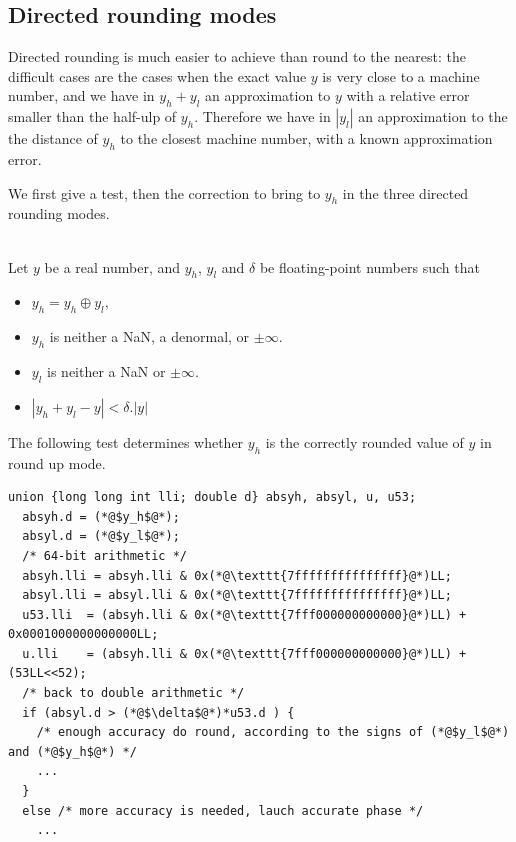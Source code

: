 \subsection{Directed rounding modes}

Directed rounding is much easier to achieve than round to the nearest:
the difficult cases are the cases when the exact value $y$ is very
close to a machine number, and we have in $y_h+y_l$ an approximation to
$y$ with a relative error smaller than the half-ulp of $y_h$.
Therefore we have in $|y_l|$ an approximation to the the distance of
$y_h$ to the closest machine number, with a known approximation error.

We first give a test, then the correction to bring to $y_h$ in the
three directed rounding modes.
\begin{theorem}
\label{th:roundingDirected}
~\\
Let $y$ be a real number, and $y_h$, $y_l$ and $\delta$ be
floating-point numbers such that
  \begin{itemize}
  \item $y_h=y_h\oplus y_l$,
  \item $y_h$ is neither a NaN, a denormal, or $\pm \infty$.
  \item $y_l$ is neither a NaN or $\pm \infty$.
  \item $|y_h+y_l - y| < \delta.|y|$
\end{itemize}

The following test determines whether $y_h$ is the
  correctly rounded value of $y$ in round up mode.

\begin{lstlisting}[caption={Test for directed rounding},
  firstnumber=1]
  union {long long int lli; double d} absyh, absyl, u, u53;
  absyh.d = (*@$y_h$@*);
  absyl.d = (*@$y_l$@*);
  /* 64-bit arithmetic */
  absyh.lli = absyh.lli & 0x(*@\texttt{7fffffffffffffff}@*)LL;
  absyl.lli = absyl.lli & 0x(*@\texttt{7fffffffffffffff}@*)LL;
  u53.lli  = (absyh.lli & 0x(*@\texttt{7fff000000000000}@*)LL) + 0x0001000000000000LL;
  u.lli    = (absyh.lli & 0x(*@\texttt{7fff000000000000}@*)LL) + (53LL<<52);
  /* back to double arithmetic */
  if (absyl.d > (*@$\delta$@*)*u53.d ) {
    /* enough accuracy do round, according to the signs of (*@$y_l$@*) and (*@$y_h$@*) */
    ...
  }
  else /* more accuracy is needed, lauch accurate phase */
    ...
\end{lstlisting}
\end{theorem}

